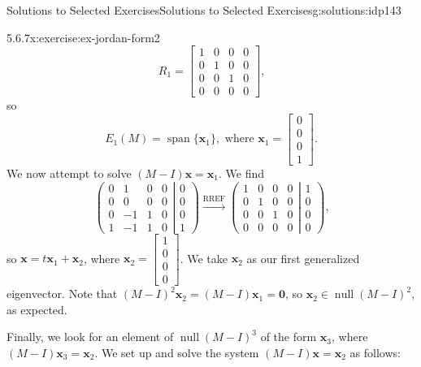 \documentclass[oneside,10pt,]{book}
\numberwithin{equation}{section}
\newcommand{\spn}{\operatorname{span}}
\newcommand{\bbm}{\begin{bmatrix}}
\newcommand{\ebm}{\end{bmatrix}}
\newcommand{\nll}{\operatorname{null}}
\newcommand{\xx}{\mathbf{x}}
\newcommand{\zer}{\mathbf{0}}
\newcommand{\amp}{&}
\begin{document}
\begin{solutions-chapter}{Solutions to Selected Exercises}{}{Solutions to Selected Exercises}{}{}{g:solutions:idp143}
\begin{inlinesolution}{5.6.7}{}{x:exercise:ex-jordan-form2}
\begin{equation*}
R_1 = \bbm 1\amp 0\amp 0\amp 0\\0\amp 1\amp 0\amp 0\\0\amp 0\amp 1\amp 0\\0\amp 0\amp 0\amp 0\ebm\text{,}
\end{equation*}
so%
\begin{equation*}
E_1(M) = \spn\{\xx_1\}, \text{ where } \xx_1 = \bbm 0\\0\\0\\1\ebm\text{.}
\end{equation*}
We now attempt to solve \((M-I)\xx=\xx_1\). We find%
\begin{equation*}
\left(\begin{matrix}0\amp 1\amp 0\amp 0\\0\amp 0\amp 0\amp 0\\0\amp -1\amp 1\amp 0\\1\amp -1\amp 1\amp 0\end{matrix}\right|\left.\begin{matrix}0\\0\\0\\1\end{matrix}\right)
\xrightarrow{\text{RREF}}
\left(\begin{matrix} 1\amp 0\amp 0\amp 0\\0\amp 1\amp 0\amp 0\\0\amp 0\amp 1\amp 0\\0\amp 0\amp 0\amp 0\end{matrix}\right|\left.\begin{matrix}1\\0\\0\\0\end{matrix}\right)\text{,}
\end{equation*}
so \(\xx = t\xx_1+\xx_2\), where \(\xx_2 = \bbm 1\\0\\0\\0\ebm\). We take \(\xx_2\) as our first generalized eigenvector. Note that \((M-I)^2\xx_2 = (M-I)\xx_1=\zer\), so \(\xx_2\in \nll (M-I)^2\), as expected.%
\par
Finally, we look for an element of \(\nll (M-I)^3\) of the form \(\xx_3\), where \((M-I)\xx_3=\xx_2\). We set up and solve the system \((M-I)\xx=\xx_2\) as follows:%
\begin{equation*}

\end{equation*}
\end{inlinesolution}
\end{solutions-chapter}
\end{document}
